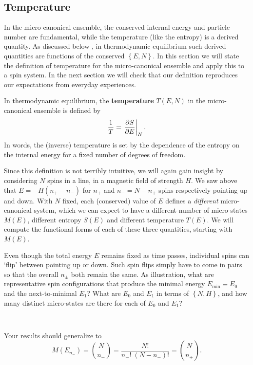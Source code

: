 \subsection{\label{sec:temp}Temperature}
In the micro-canonical ensemble, the conserved internal energy and particle number are fundamental, while the temperature (like the entropy) is a derived quantity.
As discussed below , in thermodynamic equilibrium such derived quantities are functions of the conserved $\left\{E, N\right\}$.
In this section we will state the definition of temperature for the micro-canonical ensemble and apply this to a spin system.
In the next section we will check that our definition reproduces our expectations from everyday experiences.

\begin{shaded}
  In thermodynamic equilibrium, the \textbf{temperature} $T(E, N)$ in the micro-canonical ensemble is defined by
  \begin{equation}
    \label{eq:temperature}
    \frac{1}{T} = \left. \frac{\partial S}{\partial E}\right|_N.
  \end{equation}
  In words, the (inverse) temperature is set by the dependence of the entropy on the internal energy for a fixed number of degrees of freedom.
\end{shaded}

Since this definition is not terribly intuitive, we will again gain insight by considering $N$ spins in a line, in a magnetic field of strength $H$.
We saw above that $E = -H(n_+ - n_-)$ for $n_+$ and $n_- = N - n_+$ spins respectively pointing up and down.
With $N$ fixed, each (conserved) value of $E$ defines a \textit{different} micro-canonical system, which we can expect to have a different number of micro-states $M(E)$, different entropy $S(E)$ and different temperature $T(E)$.
We will compute the functional forms of each of these three quantities, starting with $M(E)$.

Even though the total energy $E$ remains fixed as time passes, individual spins can `flip' between pointing up or down.
Such spin flips simply have to come in pairs so that the overall $n_{\pm}$ both remain the same.
As illustration, what are representative spin configurations that produce the minimal energy $E_{\text{min}} \equiv E_0$ and the next-to-minimal $E_1$?
What are $E_0$ and $E_1$ in terms of $\left\{N, H\right\}$, and how many distinct micro-states are there for each of $E_0$ and $E_1$?
\begin{mdframed}
  \ \\[100 pt]
\end{mdframed}
Your results should generalize to
\begin{equation}
  \label{eq:spin_states}
  M(E_{n_-}) = \binom{N}{n_-} = \frac{N!}{n_-! \; (N - n_-)!} = \binom{N}{n_+}.
\end{equation}

